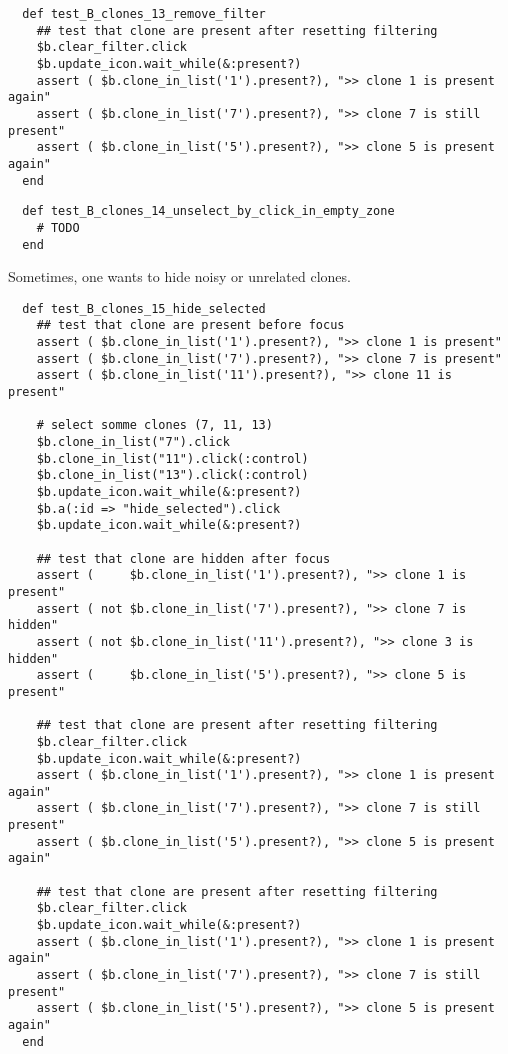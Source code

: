 \begin{verbatim}
  def test_B_clones_13_remove_filter
    ## test that clone are present after resetting filtering
    $b.clear_filter.click
    $b.update_icon.wait_while(&:present?)
    assert ( $b.clone_in_list('1').present?), ">> clone 1 is present again"
    assert ( $b.clone_in_list('7').present?), ">> clone 7 is still present"
    assert ( $b.clone_in_list('5').present?), ">> clone 5 is present again"
  end
\end{verbatim}

\begin{verbatim}
  def test_B_clones_14_unselect_by_click_in_empty_zone
    # TODO
  end
\end{verbatim}

Sometimes, one wants to hide noisy or unrelated clones.

\begin{verbatim}
  def test_B_clones_15_hide_selected
    ## test that clone are present before focus
    assert ( $b.clone_in_list('1').present?), ">> clone 1 is present"
    assert ( $b.clone_in_list('7').present?), ">> clone 7 is present"
    assert ( $b.clone_in_list('11').present?), ">> clone 11 is present"
    
    # select somme clones (7, 11, 13)
    $b.clone_in_list("7").click
    $b.clone_in_list("11").click(:control)
    $b.clone_in_list("13").click(:control)
    $b.update_icon.wait_while(&:present?)
    $b.a(:id => "hide_selected").click
    $b.update_icon.wait_while(&:present?)

    ## test that clone are hidden after focus
    assert (     $b.clone_in_list('1').present?), ">> clone 1 is present"
    assert ( not $b.clone_in_list('7').present?), ">> clone 7 is hidden"
    assert ( not $b.clone_in_list('11').present?), ">> clone 3 is hidden"
    assert (     $b.clone_in_list('5').present?), ">> clone 5 is present"

    ## test that clone are present after resetting filtering
    $b.clear_filter.click
    $b.update_icon.wait_while(&:present?)
    assert ( $b.clone_in_list('1').present?), ">> clone 1 is present again"
    assert ( $b.clone_in_list('7').present?), ">> clone 7 is still present"
    assert ( $b.clone_in_list('5').present?), ">> clone 5 is present again"

    ## test that clone are present after resetting filtering
    $b.clear_filter.click
    $b.update_icon.wait_while(&:present?)
    assert ( $b.clone_in_list('1').present?), ">> clone 1 is present again"
    assert ( $b.clone_in_list('7').present?), ">> clone 7 is still present"
    assert ( $b.clone_in_list('5').present?), ">> clone 5 is present again"
  end
\end{verbatim}

